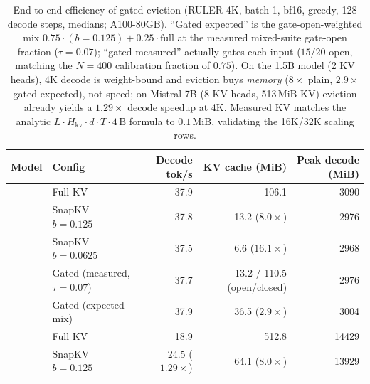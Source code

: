 \documentclass{article}
\begin{document}
\begin{table}[t]
\centering
\caption{End-to-end efficiency of gated eviction (RULER 4K, batch 1,
bf16, greedy, 128 decode steps, medians; A100-80GB). ``Gated expected''
is the gate-open-weighted mix $0.75 \cdot (b{=}0.125) + 0.25 \cdot \mathrm{full}$ at
the measured mixed-suite gate-open fraction ($\tau{=}0.07$); ``gated
measured'' actually gates each input ($15/20$ open, matching the
$N{=}400$ calibration fraction of $0.75$). On the 1.5B model (2 KV
heads), 4K decode is weight-bound and eviction buys \emph{memory}
($8\times$ plain, $2.9\times$ gated expected), not speed; on
Mistral-7B (8 KV heads, 513\,MiB KV) eviction already yields a
$1.29\times$ decode speedup at 4K. Measured KV matches the analytic
$L \cdot H_{\mathrm{kv}} \cdot d \cdot T \cdot 4$\,B formula to
$0.1$\,MiB, validating the 16K/32K scaling rows.}
\label{tab:latency}
\small
\setlength{\tabcolsep}{4pt}
\begin{tabular}{llrrr}
\toprule
Model & Config & Decode tok/s & KV cache (MiB) & Peak decode (MiB) \\
\midrule
{}
 & Full KV                   & 37.9 & 106.1 & 3090 \\
 & SnapKV $b{=}0.125$        & 37.8 & 13.2 ($8.0\times$)  & 2976 \\
 & SnapKV $b{=}0.0625$       & 37.5 & 6.6 ($16.1\times$)  & 2968 \\
 & Gated (measured, $\tau{=}0.07$) & 37.7 & 13.2 / 110.5 (open/closed) & 2976 \\
 & Gated (expected mix)      & 37.9 & 36.5 ($2.9\times$)  & 3004 \\
\midrule
{}
 & Full KV                   & 18.9 & 512.8 & 14429 \\
 & SnapKV $b{=}0.125$        & 24.5 ($1.29\times$) & 64.1 ($8.0\times$) & 13929 \\
\bottomrule
\end{tabular}

\vspace{0.6em}

\small
\setlength{\tabcolsep}{4pt}
\end{table}
\end{document}
